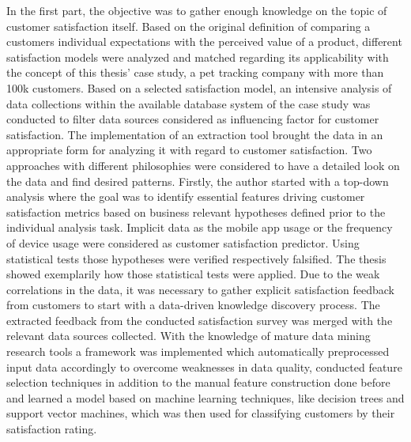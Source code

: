 In the first part, the objective was to gather enough knowledge on the topic of customer satisfaction itself. Based on the original definition of comparing a customers individual expectations with the perceived value of a product, different satisfaction models were analyzed and matched regarding its applicability with the concept of this thesis' case study, a pet tracking company with more than 100k customers. Based on a selected satisfaction model, an intensive analysis of data collections within the available database system of the case study was conducted to filter data sources considered as influencing factor for customer satisfaction. The implementation of an extraction tool brought the data in an appropriate form for analyzing it with regard to customer satisfaction. Two approaches with different philosophies were considered to have a detailed look on the data and find desired patterns. Firstly, the author started with a top-down analysis where the goal was to identify essential features driving customer satisfaction metrics based on business relevant hypotheses defined prior to the individual analysis task. Implicit data as the mobile app usage or the frequency of device usage were considered as customer satisfaction predictor. Using statistical tests those hypotheses were verified respectively falsified. The thesis showed exemplarily how those statistical tests were applied. Due to the weak correlations in the data, it was necessary to gather explicit satisfaction feedback from customers to start with a data-driven knowledge discovery process. The extracted feedback from the conducted satisfaction survey was merged with the relevant data sources collected. With the knowledge of mature data mining research tools a framework was implemented which automatically preprocessed input data accordingly to overcome weaknesses in data quality, conducted feature selection techniques in addition to the manual feature construction done before and learned a model based on machine learning techniques, like decision trees and support vector machines, which was then used for classifying customers by their satisfaction rating. 

